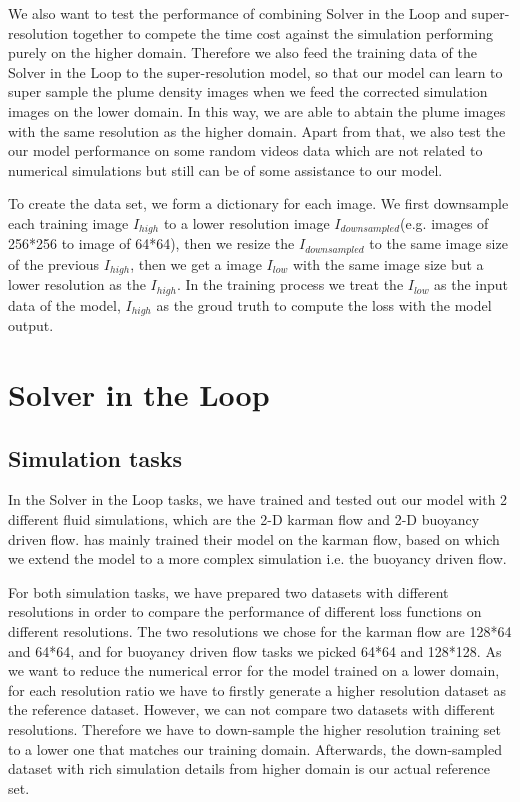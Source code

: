 \documentclass[a4paper,12pt,twoside]{report}
\begin{document}
We also want to test the performance of combining Solver in the Loop and super-resolution together to compete the time cost against the simulation performing purely on the higher domain. Therefore we also feed the training data of the Solver in the Loop to the super-resolution model, so that our model can learn to super sample the plume density images when we feed the corrected simulation images on the lower domain. In this way, we are able to abtain the plume images with the same resolution as the higher domain. Apart from that, we also test the our model performance on some random videos data which are not related to numerical simulations but still can be of some assistance to our model.

To create the data set, we form a dictionary for each image. We first downsample each training image $I_{high}$ to a lower resolution image $I_{downsampled}$(e.g. images of 256*256 to image of 64*64), then we resize the $I_{downsampled}$ to the same image size of the previous $I_{high}$, then we get a image $I_{low}$ with the same image size but a lower resolution as the $I_{high}$. In the training process we treat the $I_{low}$ as the input data of the model, $I_{high}$ as the groud truth to compute the loss with the model output.
\section{Solver in the Loop}
\subsection{Simulation tasks}
In the Solver in the Loop tasks, we have trained and tested out our model with 2 different fluid simulations, which are the 2-D karman flow and 2-D buoyancy driven flow. \citeauthor{um2020sol} has mainly trained their model on the karman flow, based on which we extend the model to a more complex simulation i.e. the buoyancy driven flow. 

For both simulation tasks, we have prepared two datasets with different resolutions in order to compare the performance of different loss functions on different resolutions. The two resolutions we chose for the karman flow are 128*64 and 64*64, and for buoyancy driven flow tasks we picked 64*64 and 128*128. As we want to reduce the numerical error for the model trained on a lower domain, for each resolution ratio we have to firstly generate a higher resolution dataset as the reference dataset. However, we can not compare two datasets with different resolutions. Therefore we have to down-sample the higher resolution training set to a lower one that matches our training domain. Afterwards, the down-sampled dataset with rich simulation details from higher domain is our actual reference set.
\end{document}

